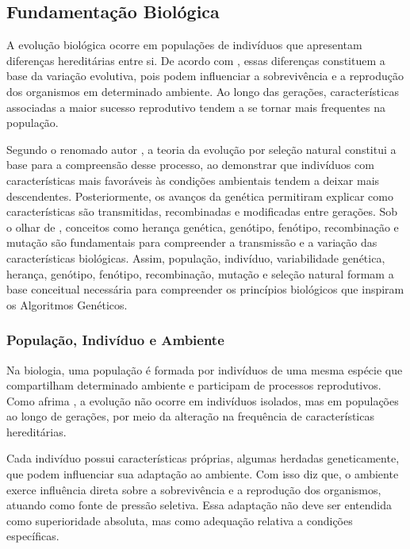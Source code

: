 \subsection{Fundamentação Biológica}
\label{subsec:fundamentacao-biologica}

A evolução biológica ocorre em populações de indivíduos que apresentam diferenças hereditárias entre si. De acordo com , essas diferenças constituem a base da variação evolutiva, pois podem influenciar a sobrevivência e a reprodução dos organismos em determinado ambiente. Ao longo das gerações, características associadas a maior sucesso reprodutivo tendem a se tornar mais frequentes na população.

Segundo o renomado autor , a teoria da evolução por seleção natural constitui a base para a compreensão desse processo, ao demonstrar que indivíduos com características mais favoráveis às condições ambientais tendem a deixar mais descendentes. Posteriormente, os avanços da genética permitiram explicar como características são transmitidas, recombinadas e modificadas entre gerações. Sob o olhar de , conceitos como herança genética, genótipo, fenótipo, recombinação e mutação são fundamentais para compreender a transmissão e a variação das características biológicas. Assim, população, indivíduo, variabilidade genética, herança, genótipo, fenótipo, recombinação, mutação e seleção natural formam a base conceitual necessária para compreender os princípios biológicos que inspiram os Algoritmos Genéticos.

\subsubsection{População, Indivíduo e Ambiente}
\label{subsubsec:populacao-individuo-ambiente}

Na biologia, uma população é formada por indivíduos de uma mesma espécie que compartilham determinado ambiente e participam de processos reprodutivos. Como afrima , a evolução não ocorre em indivíduos isolados, mas em populações ao longo de gerações, por meio da alteração na frequência de características hereditárias.

Cada indivíduo possui características próprias, algumas herdadas geneticamente, que podem influenciar sua adaptação ao ambiente. Com isso  diz que, o ambiente exerce influência direta sobre a sobrevivência e a reprodução dos organismos, atuando como fonte de pressão seletiva. Essa adaptação não deve ser entendida como superioridade absoluta, mas como adequação relativa a condições específicas.

